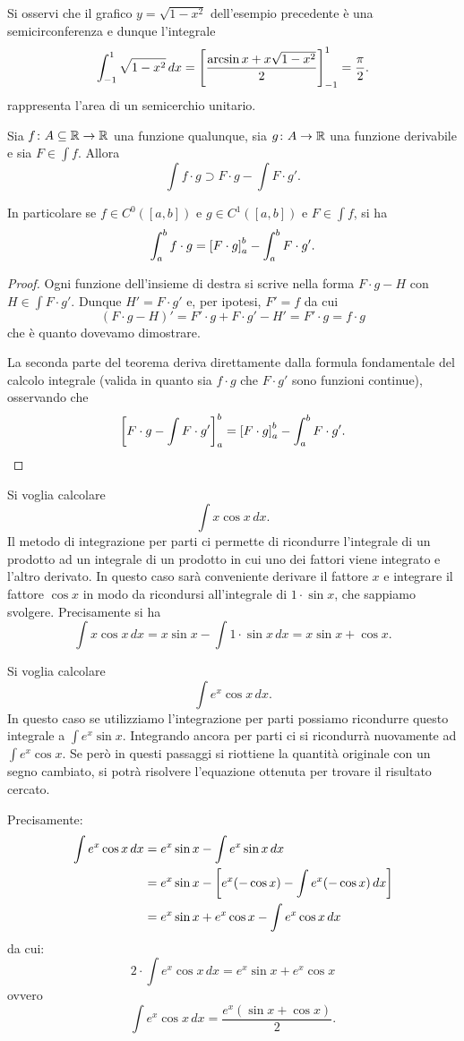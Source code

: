 Si osservi che il grafico $y=\sqrt{1-x^2}$ dell'esempio precedente
è una semicirconferenza e dunque l'integrale 
\[
 \int_{-1}^1 \sqrt{1-x^2}\, dx = {\left[ \frac{\arcsin x +x\sqrt{1-x^2}}{2} \right]}_{-1}^{1}
 = \frac{\pi}{2}.
\]
rappresenta l'area di un semicerchio unitario.

\begin{theorem}
\mymark{*}
Sia $f\colon A\subseteq \mathbb R \to \mathbb R$ una funzione qualunque, sia $g\colon A \to\mathbb R$
una funzione derivabile
e sia $F \in \int f$.
Allora
\[
  \int f\cdot g \supset F \cdot g - \int F \cdot g'.
\]

In particolare se $f\in C^0([a,b])$ e $g\in C^1([a,b])$
e $F \in \int f$, si ha
\[
  \int_a^b f\cdot g = {\left[ F\cdot g \right]}_a^b - \int_a^b F \cdot g'.
\]
\end{theorem}
%
\begin{proof}
\mymark{*}
Ogni funzione dell'insieme di destra si scrive nella forma
$F\cdot g - H$ con $H \in \int F \cdot g'$.
Dunque $H' = F \cdot g'$ e, per ipotesi, $F'=f$ da cui
\[
(F\cdot g - H)' = F' \cdot g + F \cdot g' - H' = F' \cdot g
= f\cdot g
\]
che è quanto dovevamo dimostrare.

La seconda parte del teorema
deriva direttamente dalla formula fondamentale del calcolo integrale
(valida in quanto sia $f\cdot g$ che $F \cdot g'$ sono funzioni continue),
osservando che
\[
{\left[ F\cdot g - \int F \cdot g' \right]}_a^b
= {\left[ F\cdot g \right]}_a^b - \int_a^b F \cdot g'.
\]
\end{proof}

\begin{example}
Si voglia calcolare
\[
  \int x \cos x\, dx.
\]
Il metodo di integrazione per parti ci permette
di ricondurre l'integrale di un prodotto ad un integrale
di un prodotto in cui uno dei fattori viene integrato e l'altro derivato.
In questo caso sarà conveniente derivare il fattore $x$
e integrare il fattore $\cos x$ in modo da ricondursi all'integrale di
$1\cdot \sin x$, che sappiamo svolgere.
Precisamente si ha
\[
 \int x \cos x\, dx = x \sin x - \int 1 \cdot \sin x \, dx
  = x \sin x + \cos x.
\]
\end{example}

\begin{example}
Si voglia calcolare
\[
 \int e^x \cos x\, dx.
\]
In questo caso se utilizziamo l'integrazione per parti possiamo ricondurre
questo integrale a $\int e^x \sin x$. Integrando ancora per parti ci si
ricondurrà nuovamente ad $\int e^x \cos x$. Se però in questi passaggi si
riottiene la quantità originale con un segno cambiato, si potrà risolvere
l'equazione ottenuta per trovare il risultato cercato.

Precisamente:
\begin{align*}
\int e^x \cos x\, dx
&= e^x \sin x - \int e^x \sin x\, dx\\
 &= e^x \sin x - {\left[ e^x(-\cos x) - \int e^x(-\cos x)\, dx \right]} \\
 &= e^x \sin x + e^x \cos x - \int e^x \cos x \, dx
\end{align*}
da cui:
\[
 2 \cdot \int e^x \cos x\, dx  = e^x \sin x + e^x \cos x
\]
ovvero
\[
  \int e^x \cos x\, dx = \frac{e^x(\sin x + \cos x)}{2}.
\]
\end{example}

